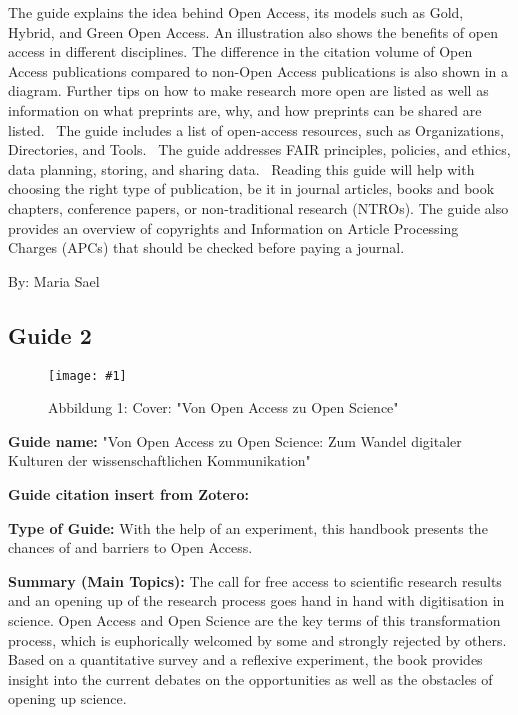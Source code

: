 \documentclass{article}
\newlength{\imgwidth}
\newcommand\scaledgraphics[2]{%
                
\settowidth{\imgwidth}{\texttt{[image: \#1]}}%
                
\setlength{\imgwidth}{\minof{\imgwidth}{#2\textwidth}}%
                
\texttt{[image: \#1]}%
                
}
\begin{document}
The guide explains the idea behind Open Access, its models such as Gold, Hybrid, and Green Open Access. An illustration also shows the benefits of open access in different disciplines. The difference in the citation volume of Open Access publications compared to non-Open Access publications is also shown in a diagram. Further tips on how to make research more open are listed as well as information on what preprints are, why, and how preprints can be shared are listed.  The guide includes a list of open-access resources, such as Organizations, Directories, and Tools.  The guide addresses FAIR principles, policies, and ethics, data planning, storing, and sharing data.  Reading this guide will help with choosing the right type of publication, be it in journal articles, books and book chapters, conference papers, or non-traditional research (NTROs). The guide also provides an overview of copyrights and Information on Article Processing Charges (APCs) that should be checked before paying a journal.


By: Maria Sael 


\subsection{Guide 2}\label{H9740541}



\begin{center}
\begin{figure}
\scaledgraphics{499c4719-8346-4a67-8a5b-fcacfb0ecde0.png}{0.5}
\caption*{Abbildung 1: Cover: "Von Open Access zu Open Science"}\label{F14991031}
\end{figure}


\end{center}





\textbf{Guide name:} "Von Open Access zu Open Science: Zum Wandel digitaler Kulturen der wissenschaftlichen Kommunikation"


\textbf{Guide citation insert from Zotero:}  \autocite{heise_von_2018}


\textbf{Type of Guide: }With the help of an experiment, this handbook presents the chances of and barriers to Open Access.


\textbf{Summary (Main Topics): }The call for free access to scientific research results and an opening up of the research process goes hand in hand with digitisation in science. Open Access and Open Science are the key terms of this transformation process, which is euphorically welcomed by some and strongly rejected by others. Based on a quantitative survey and a reflexive experiment, the book provides insight into the current debates on the opportunities as well as the obstacles of opening up science.
\end{document}
